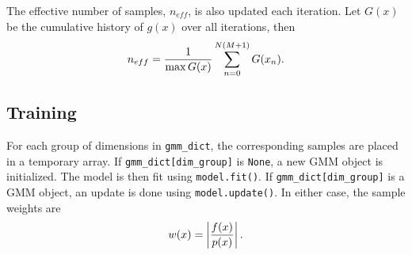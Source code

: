 \documentclass{article}
\begin{document}
The effective number of samples, $n_{eff}$, is also updated each iteration. Let
$G(x)$ be the cumulative history of $g(x)$ over all iterations, then
\begin{equation}
    n_{eff} = {1 \over \max{G(x)}} \sum_{n=0}^{N (M+1)} G(x_n).
\end{equation}

\subsection{Training}

For each group of dimensions in \texttt{gmm\_dict}, the corresponding samples
are placed in a temporary array. If \texttt{gmm\_dict[dim\_group]} is
\texttt{None}, a new GMM object is initialized. The model is then fit using
\texttt{model.fit()}. If \texttt{gmm\_dict[dim\_group]} is a GMM object,
an update is done using \texttt{model.update()}. In either case, the sample
weights are
\begin{equation}
    w(x) = \left| {f(x) \over p(x)} \right|.
\end{equation}
\nocite{*}
{}

\end{document}
